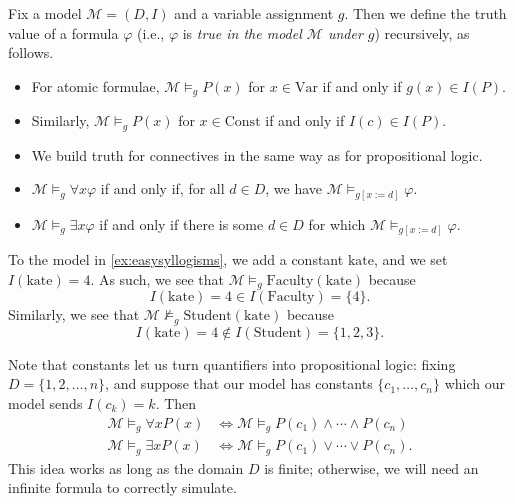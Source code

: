 \begin{defihelper}[Truth]
	Fix a model $\mathcal M=(D,I)$ and a variable assignment $g$. Then we define the truth value of a formula $\varphi$ (i.e., $\varphi$ is \textit{true in the model $\mathcal M$ under $g$}) recursively, as follows.
	\begin{itemize}
		\item For atomic formulae, $\mathcal M\models_gP(x)$ for $x\in\mathrm{Var}$ if and only if $g(x)\in I(P)$.
		\item Similarly, $\mathcal M\models_gP(x)$ for $x\in\mathrm{Const}$ if and only if $I(c)\in I(P)$.
		\item We build truth for connectives in the same way as for propositional logic.
		\item $\mathcal M\models_g\forall x\varphi$ if and only if, for all $d\in D$, we have $\mathcal M\models_{g[x:=d]}\varphi$.
		\item $\mathcal M\models_g\exists x\varphi$ if and only if there is some $d\in D$ for which $\mathcal M\models_{g[x:=d]}\varphi$.
	\end{itemize}
\end{defihelper}
\begin{example}
	To the model in \autoref{ex:easysyllogisms}, we add a constant $\mathrm{kate}$, and we set $I(\mathrm{kate})=4$. As such, we see that $\mathcal M\models_g\mathrm{Faculty}(\mathrm{kate})$ because
	\[I(\mathrm{kate})=4\in I(\mathrm{Faculty})=\{4\}.\]
	Similarly, we see that $\mathcal M\nvDash_g\mathrm{Student}(\mathrm{kate})$ because
	\[I(\mathrm{kate})=4\notin I(\mathrm{Student})=\{1,2,3\}.\]
\end{example}
Note that constants let us turn quantifiers into propositional logic: fixing $D=\{1,2,\ldots,n\}$, and suppose that our model has constants $\{c_1,\ldots,c_n\}$ which our model sends $I(c_k)=k$. Then
\begin{align*}
	\mathcal M\models_g\forall xP(x) &\iff\mathcal M\models_gP(c_1)\land\cdots\land P(c_n) \\
	\mathcal M\models_g\exists xP(x) &\iff\mathcal M\models_gP(c_1)\lor\cdots\lor P(c_n).
\end{align*}
This idea works as long as the domain $D$ is finite; otherwise, we will need an infinite formula to correctly simulate.

